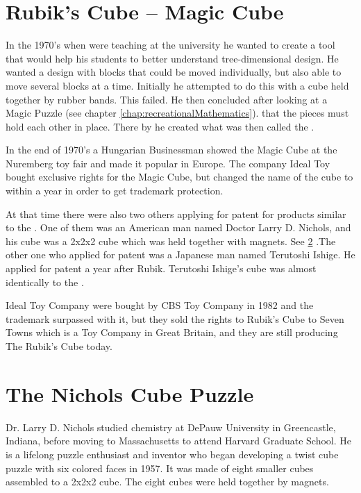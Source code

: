 \section{Rubik's Cube -- Magic Cube}


In the 1970's when \erno{} were teaching at the university he wanted to create a tool that would help his students to better understand tree-dimensional design. He wanted a design with blocks that could be moved individually, but also able to move several blocks at a time. Initially he attempted to do this with a cube held together by rubber bands. This failed. He then concluded after looking at a  Magic Puzzle (see chapter \ref{chap:recreationalMathematics}).
 that the pieces must hold each other in place. There by he created what was then called the \mcube{}. 


In the end of 1970's a Hungarian Businessman showed the Magic Cube at the Nuremberg toy fair and made it popular in Europe. The company Ideal Toy bought exclusive rights for the Magic Cube, but changed the name of the cube to \rubik{} within a year in order to get trademark protection.

At that time there were also two others applying for patent for products similar to the \rubik{}.  One of them was an American man named Doctor Larry D. Nichols, and his cube was a 2x2x2 cube which was held together with magnets. See \ref{sec:nichols} .The other one who applied for patent was a Japanese man named Terutoshi Ishige. He applied for patent a year after Rubik. Terutoshi Ishige's cube was almost identically to the \rubik{}.

Ideal Toy Company were bought by CBS Toy Company in 1982 and the trademark surpassed with it, but they sold the rights to Rubik's Cube to Seven Towns which is a Toy Company in Great Britain, and they are still producing The Rubik's Cube today.

\section{The Nichols Cube Puzzle}
\label{sec:nichols}
Dr. Larry D. Nichols studied chemistry at DePauw University in Greencastle, Indiana, before moving to Massachusetts to attend Harvard Graduate School. 
He is a lifelong puzzle enthusiast and inventor who  began developing a twist cube puzzle with six colored faces in 1957. It was made of eight smaller cubes assembled to a 2x2x2 cube. The eight cubes were held together by magnets.

